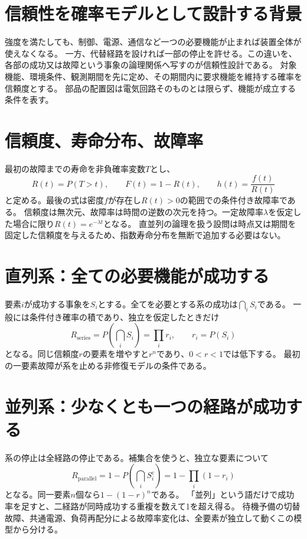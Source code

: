 \section{信頼性を確率モデルとして設計する背景}
\label{theory:dependability:background}
強度を満たしても、制御、電源、通信など一つの必要機能が止まれば装置全体が使えなくなる。
一方、代替経路を設ければ一部の停止を許せる。この違いを、各部の成功又は故障という事象の論理関係へ写すのが信頼性設計である。
対象機能、環境条件、観測期間を先に定め、その期間内に要求機能を維持する確率を信頼度とする。
部品の配置図は電気回路そのものとは限らず、機能が成立する条件を表す。

\section{信頼度、寿命分布、故障率}
\label{theory:dependability:definition}
最初の故障までの寿命を非負確率変数\(T\)とし、
\[
 R(t)=P(T>t),\qquad F(t)=1-R(t),\qquad
 h(t)=\frac{f(t)}{R(t)}
\]
と定める。最後の式は密度\(f\)が存在し\(R(t)>0\)の範囲での条件付き故障率である。
信頼度は無次元、故障率は時間の逆数の次元を持つ。一定故障率\(\lambda\)を仮定した場合に限り\(R(t)=e^{-\lambda t}\)となる。
直並列の論理を扱う設問は時点又は期間を固定した信頼度を与えるため、指数寿命分布を無断で追加する必要はない。
\cite{reliability_nist_series}

\section{直列系：全ての必要機能が成功する}
\label{theory:dependability:series}
要素\(i\)が成功する事象を\(S_i\)とする。全てを必要とする系の成功は\(\bigcap_i S_i\)である。
一般には条件付き確率の積であり、独立を仮定したときだけ
\[
 R_{\mathrm{series}}=P\left(\bigcap_i S_i\right)=\prod_i r_i,
 \qquad r_i=P(S_i)
\]
となる。同じ信頼度\(r\)の要素を増やすと\(r^n\)であり、\(0<r<1\)では低下する。
最初の一要素故障が系を止める非修復モデルの条件である。\cite{reliability_nist_series}

\section{並列系：少なくとも一つの経路が成功する}
\label{theory:dependability:parallel}
系の停止は全経路の停止である。補集合を使うと、独立な要素について
\[
 R_{\mathrm{parallel}}
 =1-P\left(\bigcap_i S_i^{\mathrm c}\right)
 =1-\prod_i(1-r_i)
\]
となる。同一要素\(n\)個なら\(1-(1-r)^n\)である。
「並列」という語だけで成功率を足すと、二経路が同時成功する重複を数えて1を超え得る。
待機予備の切替故障、共通電源、負荷再配分による故障率変化は、全要素が独立して動くこの模型から分ける。\cite{reliability_nist_parallel}

